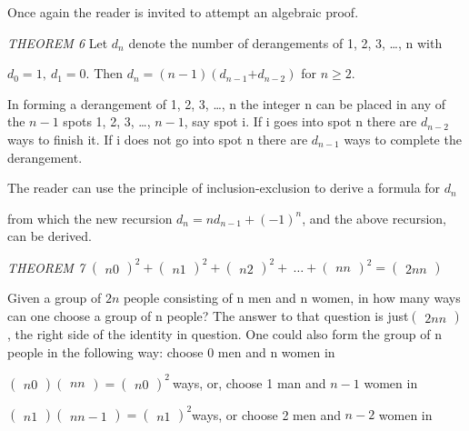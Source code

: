\documentclass[10pt,letter]{article}
\begin{document}
Once again the reader is invited to attempt an algebraic proof.

\emph{THEOREM 6} Let \(d_{n}\) denote the number of derangements of 1,
2, 3, \ldots{}, n with

\(d_{0} = 1,\ d_{1} = 0.\) Then
\(d_{n} = \left( n - 1 \right)(d_{n - 1}{+ d}_{n - 2})\) for
\(n \geq 2\).

In forming a derangement of 1, 2, 3, \ldots{}, n the integer n can be
placed in any of the \(n - 1\) spots 1, 2, 3, \ldots{}, \(n - 1\), say
spot i. If i goes into spot n there are \(d_{n - 2}\) ways to finish it.
If i does not go into spot n there are \(d_{n - 1}\) ways to complete
the derangement.

The reader can use the principle of inclusion-exclusion to derive a
formula for \(d_{n}\)

from which the new recursion
\(d_{n} = nd_{n - 1} + \left( - 1 \right)^{n}\), and the above
recursion, can be derived.

\emph{THEOREM 7} \(\begin{pmatrix}
n
0
\end{pmatrix}
^{2} +
\begin{pmatrix}
n
1
\end{pmatrix}
^{2} +
\begin{pmatrix}
n
2
\end{pmatrix}
^{2} + \ \ldots +
\begin{pmatrix}
n
n
\end{pmatrix}
^{2} =
\begin{pmatrix}
2n
n
\end{pmatrix}
\)

Given a group of \(2n\) people consisting of n men and n women, in how
many ways can one choose a group of n people? The answer to that
question is just\(\begin{pmatrix}
2n
n
\end{pmatrix}
\), the right side of the identity in question. One could
also form the group of n people in the following way: choose 0 men and n
women in

\(\begin{pmatrix}
n
0
\end{pmatrix}
\begin{pmatrix}
n
n
\end{pmatrix}
 =
\begin{pmatrix}
n
0
\end{pmatrix}
^{2}\ \)ways, or, choose 1 man and \(n - 1\) women in

\(\begin{pmatrix}
n
1
\end{pmatrix}
\begin{pmatrix}
n
n - 1
\end{pmatrix}
 =
\begin{pmatrix}
n
1
\end{pmatrix}
^{2}\)ways, or choose 2 men and \(n - 2\) women in
\end{document}
